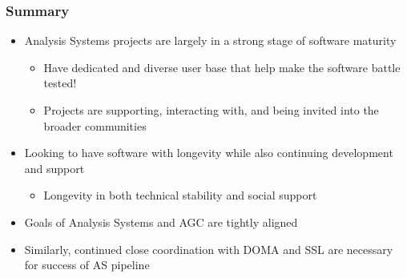 \begin{frame}
  \frametitle{Summary}

  \begin{itemize}\setlength{\itemsep}{0.2 cm}
    \item Analysis Systems projects are largely in a strong stage of software maturity
    \begin{itemize}
      \item Have dedicated and diverse user base that help make the software battle tested!
      \item Projects are supporting, interacting with, and being invited into the broader communities
    \end{itemize}
    \item Looking to have software with longevity while also continuing development and support
    \begin{itemize}
      \item Longevity in both technical stability and social support
    \end{itemize}
    \item Goals of Analysis Systems and AGC are tightly aligned
    \item Similarly, continued close coordination with DOMA and SSL are necessary for success of AS pipeline
  \end{itemize}

\end{frame}
